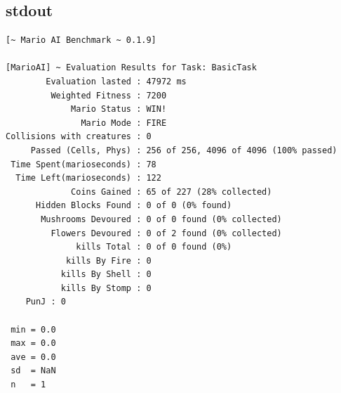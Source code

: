 \documentclass{jsarticle}
\begin{document}
\subsection{stdout}
\begin{lstlisting}
[~ Mario AI Benchmark ~ 0.1.9]

[MarioAI] ~ Evaluation Results for Task: BasicTask
        Evaluation lasted : 47972 ms
         Weighted Fitness : 7200
             Mario Status : WIN!
               Mario Mode : FIRE
Collisions with creatures : 0
     Passed (Cells, Phys) : 256 of 256, 4096 of 4096 (100% passed)
 Time Spent(marioseconds) : 78
  Time Left(marioseconds) : 122
             Coins Gained : 65 of 227 (28% collected)
      Hidden Blocks Found : 0 of 0 (0% found)
       Mushrooms Devoured : 0 of 0 found (0% collected)
         Flowers Devoured : 0 of 2 found (0% collected)
              kills Total : 0 of 0 found (0%)
            kills By Fire : 0
           kills By Shell : 0
           kills By Stomp : 0
    PunJ : 0

 min = 0.0
 max = 0.0
 ave = 0.0
 sd  = NaN
 n   = 1
\end{lstlisting}
\end{document}
